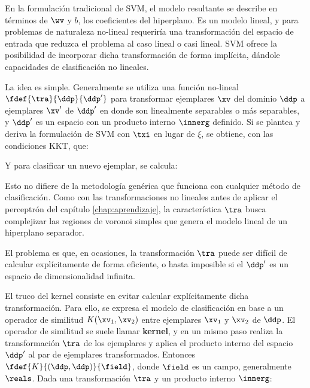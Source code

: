 En la formulación tradicional de SVM, el modelo resultante se describe en términos de $\wv$ y $b$, los coeficientes del hiperplano. Es un modelo lineal, y para problemas de naturaleza no-lineal requeriría una transformación del espacio de entrada que reduzca el problema al caso lineal o casi lineal. SVM ofrece la posibilidad de incorporar dicha transformación de forma implícita, dándole capacidades de clasificación no lineales. 


La idea es simple. Generalmente se utiliza una función no-lineal $\fdef{\tra}{\ddp}{\ddp'}$ para transformar ejemplares $\xv$ del dominio $\ddp$ a ejemplares $\xv'$ de $\ddp'$ en donde son linealmente separables o más separables, y $\ddp'$ es un espacio con un producto interno $\innerg$ definido. Si se plantea y deriva la formulación de SVM con $\txi$ en lugar de $\xi$, se obtiene, con las condiciones KKT, que:


Y para clasificar un nuevo ejemplar, se calcula:


Esto no difiere de la metodología genérica que funciona con cualquier método de clasificación. Como con las transformaciones no lineales antes de aplicar el perceptrón del capítulo \ref{chap:aprendizaje}, la característica $\tra$ busca complejizar las regiones de voronoi simples que genera el modelo lineal de un hiperplano separador.


El problema es que, en ocasiones, la transformación $\tra$ puede ser difícil de calcular explícitamente de forma eficiente, o hasta imposible si el $\ddp'$ es un espacio de dimensionalidad infinita. 

El truco del kernel consiste en evitar calcular explícitamente dicha transformación. Para ello, se expresa el modelo de clasificación en base a un operador de similitud $K(\xv_1,\xv_2)$ entre ejemplares $\xv_1$ y $\xv_2$ de $\ddp$. El operador de similitud se suele llamar \textbf{kernel},  y en un mismo paso realiza la transformación $\tra$ de los ejemplares y aplica el producto interno del espacio $\ddp'$ al par de ejemplares transformados. Entonces $\fdef{K}{(\ddp,\ddp)}{\field}$, donde $\field$ es un campo, generalmente $\reals$. Dada una transformación $\tra$ y un producto interno $\innerg$:

